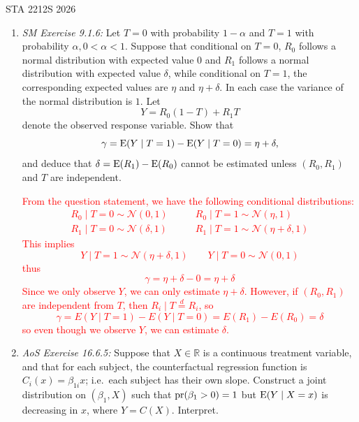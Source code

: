 \documentclass[12pt]{article}
\def\E{{\rm E}}
\def\Pr{{\rm pr}}
\newcommand{\1}{\mathds 1}
\begin{document}
 {\hfill STA 2212S 2026}\\


\bigskip

\begin{enumerate}

\item {\it SM Exercise 9.1.6: } Let $T=0$ with probability $1-\alpha$ and $T=1$ with probability $\alpha, 0<\alpha<1$. Suppose that conditional on $T=0$, $R_0$ follows a normal distribution with expected value $0$ and $R_1$ follows a normal distribution with expected value $\delta$, while conditional on $T=1$, the corresponding expected values are $\eta$ and $\eta + \delta$. In each case the variance of the normal distribution is $1$. Let $$Y = R_0(1-T)+R_1T$$ denote  the  observed response variable. Show that $$\gamma = \E(Y\mid T=1)-\E(Y\mid T=0) = \eta+\delta,$$ and deduce that $\delta = \E(R_1)-\E(R_0)$ cannot be estimated unless $(R_0, R_1)$ and $T$ are independent.

\textcolor{red}{
From the question statement, we have the following conditional distributions:
\begin{align*}
    R_0 \mid T = 0 \sim \mathcal N(0, 1) & \qquad R_0 \mid T = 1 \sim \mathcal N(\eta, 1)\\
    R_1 \mid T = 0 \sim \mathcal N(\delta, 1) & \qquad R_1 \mid T =  1 \sim \mathcal N(\eta + \delta, 1)
\end{align*}
This implies 
\begin{equation*}
    Y \mid T = 1 \sim \mathcal N(\eta + \delta, 1) \qquad Y \mid T = 0 \sim \mathcal N(0, 1)
\end{equation*}
thus 
\begin{equation*}
    \gamma = \eta + \delta - 0 = \eta + \delta
\end{equation*}
Since we only observe $Y$, we can only estimate $\eta + \delta$. However, if $(R_0, R_1)$ are independent from $T$, then $R_i \mid T \stackrel{d}{=} R_i$, so 
\begin{equation*}
    \gamma = E(Y \mid T = 1) - E(Y \mid T = 0) = E(R_1) - E(R_0) = \delta
\end{equation*}
so even though we observe $Y$, we can estimate $\delta$. 
}

\item {\it AoS Exercise 16.6.5: } Suppose that $X \in \mathbb{R}$ is a continuous treatment variable, and that for each subject, the counterfactual regression function is $C_i(x) = \beta_{1i}x$; i.e.~each subject has their own slope. Construct a joint distribution on $(\beta_1, X)$ such that $\Pr(\beta_1 > 0 ) = 1$ but $\E(Y\mid X=x)$ is decreasing in $x$, where $Y=C(X)$. Interpret.


\end{enumerate}
\end{document}
